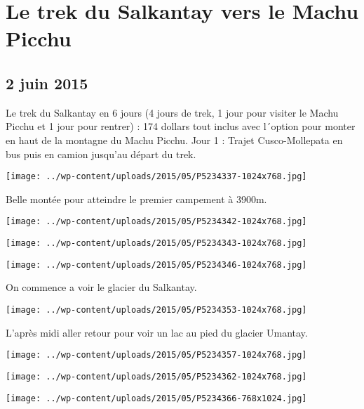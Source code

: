 \chapter{Le trek du Salkantay vers le Machu Picchu}
\section*{2 juin 2015}
Le trek du Salkantay en 6 jours (4 jours de trek, 1 jour pour visiter le Machu Picchu et 1 jour pour rentrer) : 174 dollars tout inclus avec l´option pour monter en haut de la montagne du Machu Picchu. \newline
 Jour 1 : \newline
 Trajet Cusco-Mollepata en bus puis en camion jusqu'au départ du trek. \newline
 \newline
\centerline{\texttt{[image: ../wp-content/uploads/2015/05/P5234337-1024x768.jpg]} } 
 \newline
 Belle montée pour atteindre le premier campement à 3900m. \newline
 \newline
\centerline{\texttt{[image: ../wp-content/uploads/2015/05/P5234342-1024x768.jpg]} } 
 \newline
 \newline
\centerline{\texttt{[image: ../wp-content/uploads/2015/05/P5234343-1024x768.jpg]} } 
 \newline
 \newline
\centerline{\texttt{[image: ../wp-content/uploads/2015/05/P5234346-1024x768.jpg]} } 
 \newline
 On commence a voir le glacier du Salkantay. \newline
 \newline
\centerline{\texttt{[image: ../wp-content/uploads/2015/05/P5234353-1024x768.jpg]} } 
 \newline
 L'après midi aller retour pour voir un lac au pied du glacier Umantay. \newline
 \newline
\centerline{\texttt{[image: ../wp-content/uploads/2015/05/P5234357-1024x768.jpg]} } 
 \newline
 \newline
\centerline{\texttt{[image: ../wp-content/uploads/2015/05/P5234362-1024x768.jpg]} } 
 \newline
 \newline
\centerline{\texttt{[image: ../wp-content/uploads/2015/05/P5234366-768x1024.jpg]} } 
